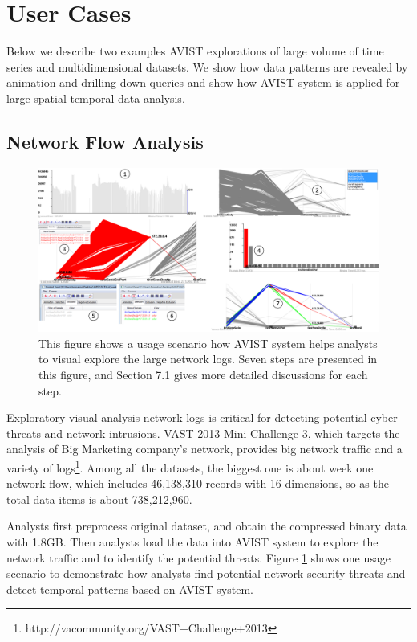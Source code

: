 \documentclass[journal]{vgtc}                %
\begin{document}
{\section{User Cases}
Below we describe two examples AVIST explorations of large volume of time series and multidimensional datasets. We show how data patterns are revealed by animation and drilling down queries and show how AVIST system is applied for large spatial-temporal data analysis.

\subsection{Network Flow Analysis} %

\begin{figure}[htb]
	\centering
	\includegraphics[width=1.0\linewidth]{pic/network2.png}
	\parbox[t]{1.0\columnwidth}{\relax
	}
	\caption{\label{fig:network}
		This figure shows a usage scenario how AVIST system helps analysts to visual explore the large network logs. 
		Seven steps are presented in this figure, and Section 7.1 gives more detailed discussions for each step. }
\end{figure}

Exploratory visual analysis network logs is critical for detecting potential cyber threats and network intrusions. VAST 2013 Mini Challenge 3, which targets the analysis of Big Marketing company's network, provides big network traffic and a variety of logs\footnote{http://vacommunity.org/VAST+Challenge+2013}. Among all the datasets,  the biggest one is about week one network flow, which includes 46,138,310 records with 16 dimensions, so as the total data items is about 738,212,960. 

Analysts first preprocess original dataset, and obtain the compressed binary data with 1.8GB. Then analysts load the data into AVIST system to explore the network traffic and to identify the potential threats. Figure \ref{fig:network} shows one usage scenario to demonstrate how analysts find potential network security threats and detect temporal patterns based on AVIST system. 

}
\end{document}

